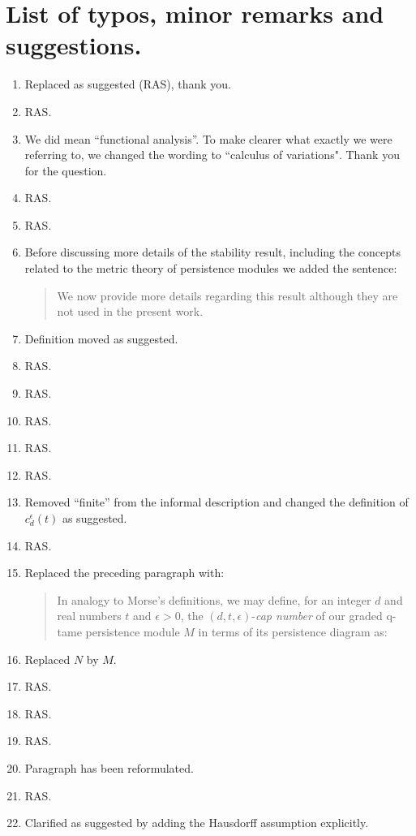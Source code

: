 \documentclass{article}
\begin{document}
	\section{List of typos, minor remarks and suggestions.}
	\begin{enumerate}
		\item Replaced as suggested (RAS), thank you.
		\item RAS.
		\item We did mean ``functional analysis''. To make clearer what exactly we were referring to, we changed the wording to ``calculus of variations". Thank you for the question.
		\item RAS.
		\item RAS.
		\item Before discussing more details of the stability result, including the concepts related to the metric theory of persistence modules we added the sentence:
		\begin{quote}
			We now provide more details regarding this result although they are not used in the present work.
		\end{quote}
		\item Definition moved as suggested.
		\item RAS.
		\item RAS.
		\item RAS.
		\item RAS.
		\item RAS.
		\item Removed ``finite'' from the informal description and changed the definition of $c_d^{\epsilon}(t)$ as suggested.
		\item RAS.
		\item Replaced the preceding paragraph with:
		\begin{quote}
			In analogy to Morse's definitions, we may define, for an integer $d$ and real numbers $t$ and $\epsilon > 0$, the $(d, t, \epsilon)$-\emph{cap number} of our graded q-tame persistence module $M$ in terms of its persistence diagram as:
		\end{quote}
		\item Replaced $N$ by $M$.
		\item RAS.
		\item RAS.
		\item RAS.
		\item Paragraph has been reformulated.
		\item RAS.
		\item Clarified as suggested by adding the Hausdorff assumption explicitly.

\end{enumerate}
\end{document}
